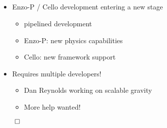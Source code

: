 \NEWSEC

\subsection{\ssFutureSummary}


\begin{frame}[fragile,label=ss-future-summary] 
\secframetitle{\ssFutureSummary}
\begin{itemize}
\item Enzo-P / Cello development entering a new stage
\begin{itemize}
\item pipelined development
\item Enzo-P: new physics capabilities
\item Cello: new framework support
\end{itemize}
\item Requires multiple developers!
\begin{itemize}
\item Dan Reynolds working on scalable gravity
\item More help wanted!
\end{itemize}
\end{itemize}
\vfill
\centerline{$\qed$}
\end{frame}

